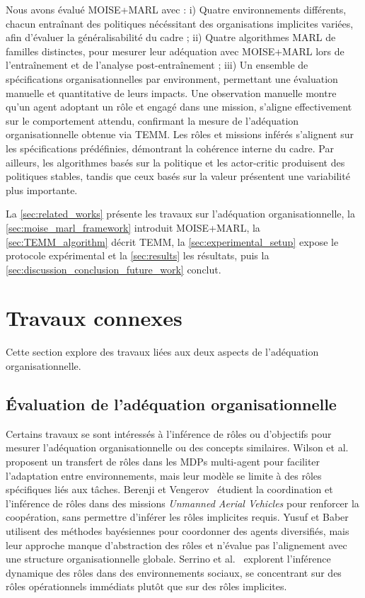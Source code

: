 \documentclass[dissemination]{jfsma}
\begin{document}
Nous avons évalué MOISE+MARL avec :
i) Quatre environnements différents, chacun entraînant des politiques nécéssitant des organisations implicites variées, afin d'évaluer la généralisabilité du cadre
 ; \quad
ii) Quatre algorithmes MARL de familles distinctes, pour mesurer leur adéquation avec MOISE+MARL lors de l'entraînement et de l'analyse post-entraînement
 ; \quad
iii) Un ensemble de spécifications organisationnelles par environment, permettant une évaluation manuelle et quantitative de leurs impacts.
%
Une observation manuelle montre qu'un agent adoptant un rôle et engagé dans une mission, s'aligne effectivement sur le comportement attendu, confirmant la mesure de l'adéquation organisationnelle obtenue via TEMM. Les rôles et missions inférés s'alignent sur les spécifications prédéfinies, démontrant la cohérence interne du cadre. Par ailleurs, les algorithmes basés sur la politique et les actor-critic produisent des politiques stables, tandis que ceux basés sur la valeur présentent une variabilité plus importante.


\noindent La \autoref{sec:related_works} présente les travaux sur l'adéquation organisationnelle, la \autoref{sec:moise_marl_framework} introduit MOISE+MARL, la \autoref{sec:TEMM_algorithm} décrit TEMM, la \autoref{sec:experimental_setup} expose le protocole expérimental et la \autoref{sec:results} les résultats, puis la \autoref{sec:discussion_conclusion_future_work} conclut.

\section{Travaux connexes}
\label{sec:related_works}

Cette section explore des travaux liées aux deux aspects de l'adéquation organisationnelle.

\subsection{Évaluation de l'adéquation organisationnelle}

Certains travaux se sont intéressés à l'inférence de rôles ou d'objectifs pour mesurer l'adéquation organisationnelle ou des concepts similaires.  
%
Wilson et al.~\cite{wilson2008learning} proposent un transfert de rôles dans les MDPs multi-agent pour faciliter l'adaptation entre environnements, mais leur modèle se limite à des rôles spécifiques liés aux tâches.  
%
Berenji et Vengerov~\cite{berenji2000learning} étudient la coordination et l'inférence de rôles dans des missions \textit{Unmanned Aerial Vehicles} pour renforcer la coopération, sans permettre d'inférer les rôles implicites requis.  
%
Yusuf et Baber~\cite{yusuf2020inferential} utilisent des méthodes bayésiennes pour coordonner des agents diversifiés, mais leur approche manque d'abstraction des rôles et n'évalue pas l'alignement avec une structure organisationnelle globale.  
%
Serrino et al.~\cite{serrino2019finding} explorent l'inférence dynamique des rôles dans des environnements sociaux, se concentrant sur des rôles opérationnels immédiats plutôt que sur des rôles implicites.
\end{document}
